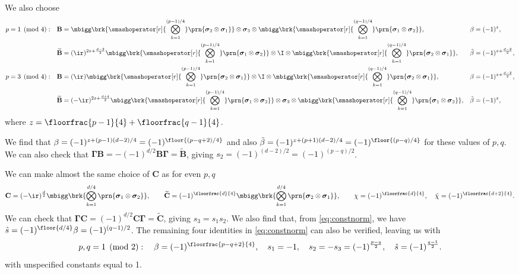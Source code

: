 \documentclass[11pt]{article}
\newcommand{\Gammab}{\boldsymbol{\Gamma}}
\newcommand{\B}{\mathbf{B}}
\renewcommand{\C}{\mathbf{C}}
\newcommand{\Bt}{\widetilde{\B}}
\newcommand{\Ct}{\widetilde{\C}}
\newcommand{\sigmab}{\boldsymbol{\sigma}}
\newcommand{\betat}{\tilde{\beta}}
\newcommand{\chit}{\tilde{\chi}}
\newcommand{\sh}{\hat{s}}
\begin{document}
We also choose
%
\begin{equation*}
\begin{aligned}
  p &= 1 \pmod 4: &
  \B &= \mbigg\brk{\smashoperator[r]{\bigotimes_{k=1}^{(p-1)/4}} 
        \prn{\sigmab_2 \otimes \sigmab_1}} \otimes
        \sigmab_3 \otimes
        \mbigg\brk{\smashoperator[r]{\bigotimes_{k=1}^{(q-1)/4}}
        \prn{\sigmab_1 \otimes \sigmab_2}}, &
  \beta &= (-1)^z, \\ &&
  \Bt &= (\ir)^{2z + \frac{d-2}{2}}
        \mbigg\brk{\smashoperator[r]{\bigotimes_{k=1}^{(p-1)/4}}
        \prn{\sigmab_1 \otimes \sigmab_2}} \otimes
        \I \otimes
        \mbigg\brk{\smashoperator[r]{\bigotimes_{k=1}^{(q-1)/4}}
        \prn{\sigmab_2 \otimes \sigmab_1}}, &
  \betat &= (-1)^{z + \frac{d-2}{2}}, \\ 
  p &= 3 \pmod 4: &
  \B &= (\ir)
        \mbigg\brk{\smashoperator[r]{\bigotimes_{k=1}^{(p-1)/4}}
        \prn{\sigmab_2 \otimes \sigmab_1}} \otimes
        \I \otimes
        \mbigg\brk{\smashoperator[r]{\bigotimes_{k=1}^{(q-1)/4}}
        \prn{\sigmab_2 \otimes \sigmab_1}}, &
  \beta &= (-1)^{z + \frac{d-2}{2}}, \\ &&
  \Bt &= (-\ir)^{2z + \frac{d+4}{2}}
        \mbigg\brk{\smashoperator[r]{\bigotimes_{k=1}^{(p-1)/4}}
        \prn{\sigmab_1 \otimes \sigmab_2}} \otimes
        \sigmab_3 \otimes
        \mbigg\brk{\smashoperator[r]{\bigotimes_{k=1}^{(q-1)/4}}
        \prn{\sigmab_1 \otimes \sigmab_2}}, &
  \betat &= (-1)^z, 
\end{aligned}
\end{equation*}
%
where \(z = \floorfrac{p-1}{4} + \floorfrac{q-1}{4}\).

We find that \( \beta = (-1)^{z + (p-1)(d-2)/4} = (-1)^{\floor{(p-q+2)/4}} \) 
and also \( \betat = (-1)^{z + (p+1)(d-2)/4} = (-1)^{\floor{(p-q)/4}} \) for these values of \(p,q\).
We can also check that \(\Gammab \B = -(-1)^{d/2}\B \Gammab = \Bt\), giving \(s_2 = (-1)^{(d-2)/2} = (-1)^{(p-q)/2}\).

We can make almost the same choice of \(\C\) as for even \(p,q\)
%
\begin{equation*}
  \C =  (-\ir)^{\frac{d}{2}}
        \mbigg\brk{\bigotimes_{k=1}^{d/4} \prn{\sigmab_1 \otimes \sigmab_2}},
  \qquad
  \Ct = (-1)^{\floorfrac{d}{4}}
        \mbigg\brk{\bigotimes_{k=1}^{d/4} \prn{\sigmab_2 \otimes \sigmab_1}},
  \qquad
  \chi = (-1)^{\floorfrac{d}{4}},
  \quad
  \chit = (-1)^{\floorfrac{d+2}{4}}.
\end{equation*}
%
We can check that \(\Gammab \C = (-1)^{d/2}\C \Gammab = \Ct\), giving \(s_3 = s_1 s_2\).
We also find that, from \cref{eq:constnorm}, we have
\( \sh = (-1)^{\floor{d/4}} \beta = (-1)^{(q-1)/2} \).
The remaining four identities in \cref{eq:constnorm} can also be verified, leaving us with
%
\begin{equation}\label{eq:constoddodd}
  p, q = 1 \pmod 2 : \quad
  \beta = (-1)^{\floorfrac{p-q+2}{4}}, \quad
  s_1 = -1, \quad
  s_2 = -s_3 = (-1)^{\frac{p-q}{2}}, \quad
  \sh = (-1)^{\frac{q-1}{2}}.
\end{equation}
%
with unspecified constants equal to 1.
\end{document}
